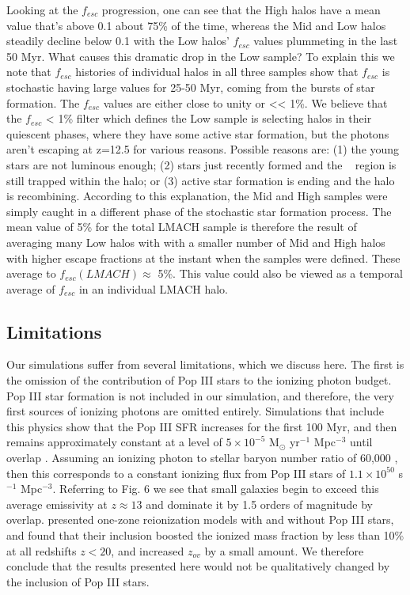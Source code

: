 \documentclass[iop,apj]{emulateapj}
\begin{document}
Looking at the $f_{esc}$ progression, one can see that the High halos have a mean value that's above 0.1 about 75\% of the time, whereas the Mid and Low halos steadily decline below 0.1 with the Low halos'  $f_{esc}$ values plummeting in the last 50 Myr.  What causes this dramatic drop in the Low sample? To explain this we note that $f_{esc}$ histories of individual halos in all three samples show that $f_{esc}$ is stochastic having large values for 25-50 Myr, coming from the bursts of star formation.  The $f_{esc}$ values are either close to unity or << 1\%.  We believe that the $f_{esc}$ < 1\% filter which defines the Low sample is selecting halos in their quiescent phases, where they have some active star formation, but the photons aren't escaping at z=12.5 for various reasons. Possible reasons are: (1) the young stars are not luminous enough; (2)  stars just recently formed and the \hii~ region is still trapped within the halo; or (3) active star formation is ending and the halo is recombining. According to this explanation, the Mid and High samples were simply caught in a different phase of the stochastic star formation process. The mean value of 5\% for the total LMACH sample is therefore the result of averaging many Low halos with with a smaller number of Mid and High halos with higher escape fractions at the instant when the samples were defined. These average to $f_{esc}(LMACH) \approx$ 5\%. This value could also be viewed as a temporal average of $f_{esc}$ in an individual LMACH halo. 

\subsection{Limitations}
\label{subsec:limitations}
Our simulations suffer from several limitations, which we discuss here. The first is the omission of the contribution of Pop III stars to the ionizing photon budget. Pop III star formation is not included in our simulation, and therefore, the very first sources of ionizing photons are omitted entirely. Simulations that include this physics show that the Pop III SFR increases for the first 100 Myr, and then remains approximately constant at a level of $5 \times 10^{-5}$ M$_{\odot}$ yr$^{-1}$ Mpc$^{-3}$ until overlap \citep{Wise12_Galaxy,Xu16a}. Assuming an ionizing photon to stellar baryon number ratio of 60,000 \citep{Schaerer02}, then this corresponds to a constant ionizing flux from Pop III stars of $1.1 \times 10^{50}$ s$^{-1}$ Mpc$^{-3}$.  Referring to Fig. 6 we see that small galaxies begin to exceed this average emissivity at $z \approx 13$ and dominate it by 1.5 orders of magnitude by overlap. \cite{Wise14} presented one-zone reionization models with and without Pop III stars, and found that their inclusion boosted the ionized mass fraction by less than 10\% at all redshifts $z<20$, and increased $z_{ov}$ by a small amount. We therefore conclude that the results presented here would not be qualitatively changed by the inclusion of Pop III stars.  
\end{document}
